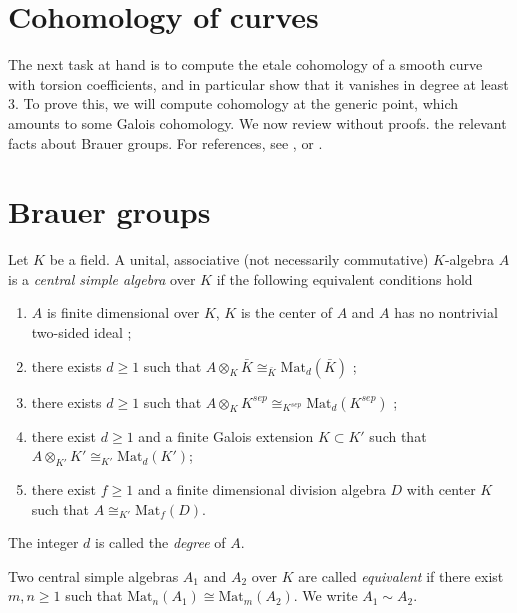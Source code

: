 \section{Cohomology of curves}
\label{section-cohomology-curves}

\noindent
The next task at hand is to compute the etale cohomology of a smooth curve
with torsion coefficients, and in particular show that it vanishes in degree at
least 3. To prove this, we will compute cohomology at the generic point, which
amounts to some Galois cohomology. We now review without proofs. the relevant
facts about Brauer groups. For references, see \cite{SerreCorpsLocaux},
\cite{SerreGaloisCohomology} or \cite{Weil}.




\section{Brauer groups}
\label{section-brauer-groups}

\begin{theorem}
\label{theorem-central-simple-algebra}
Let $K$ be a field. A unital, associative (not necessarily commutative)
$K$-algebra $A$ is a {\it central simple algebra} over $K$ if the following
equivalent conditions hold
\begin{enumerate}
\item
$A$ is finite dimensional over $K$, $K$ is the center of $A$ and $A$ has no
nontrivial two-sided ideal ;
\item
there exists $d \geq 1$ such that $A \otimes_K \bar K \cong_{\bar K}
\text{Mat}_d(\bar K)$ ;
\item
there exists $d \geq 1$ such that $A \otimes_K K^{sep} \cong_{K^{sep}}
\text{Mat}_d(K^{sep})$ ;
\item
there exist $d \geq 1$ and a finite Galois extension $K \subset K'$ such that
$A \otimes_{K'} K' \cong_{K'} \text{Mat}_d(K')$;
\item
there exist $f \geq 1$ and a finite dimensional division algebra $D$ with
center $K$ such that $A \cong_{K'} \text{Mat}_f(D)$.
\end{enumerate}
The integer $d$ is called the {\it degree} of $A$.
\end{theorem}

\begin{definition}
\label{definition-brauer-equivalent}
Two central simple algebras $A_1$ and $A_2$ over $K$ are called
{\it equivalent} if there exist $m, n \geq 1$ such that $\text{Mat}_n(A_1)
\cong \text{Mat}_m(A_2)$. We write $A_1 \sim A_2$.
\end{definition}

